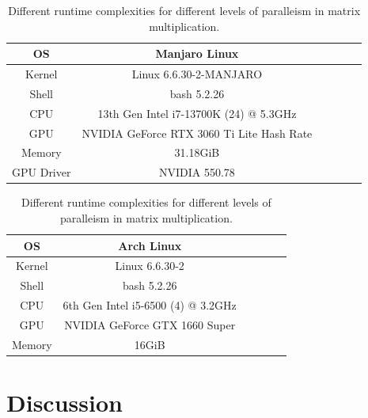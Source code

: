 \documentclass{article}
\begin{document}
    \begin{table}[h!]
        \centering
        \begin{tabular}{|c||c|c|c|c|c|}
            \hline
            OS & Manjaro Linux \\
            \hline
            Kernel & Linux 6.6.30-2-MANJARO \\
            \hline
            Shell & bash 5.2.26 \\
            \hline
            CPU & 13th Gen Intel i7-13700K (24) @ 5.3GHz \\
            \hline
            GPU & NVIDIA GeForce RTX 3060 Ti Lite Hash Rate \\
            \hline
            Memory & 31.18GiB  \\
            \hline
            GPU Driver & NVIDIA 550.78 \\
            \hline
        \end{tabular}
        \caption{Different runtime complexities for different levels of paralleism in matrix multiplication.}
        \label{tbl:homeSpecs}
    \end{table}

    \begin{table}[h!]
        \centering
        \begin{tabular}{|c||c|c|c|c|c|}
            \hline
            OS & Arch Linux \\
            \hline
            Kernel & Linux 6.6.30-2 \\
            \hline
            Shell & bash 5.2.26 \\
            \hline
            CPU & 6th Gen Intel i5-6500 (4) @ 3.2GHz \\
            \hline
            GPU & NVIDIA GeForce GTX 1660 Super \\
            \hline
            Memory & 16GiB  \\
            \hline
        \end{tabular}
        \caption{Different runtime complexities for different levels of paralleism in matrix multiplication.}
        \label{tbl:officeSpecs}
    \end{table}

    \clearpage
    \pagebreak
\section{Discussion}
    
\end{document}
